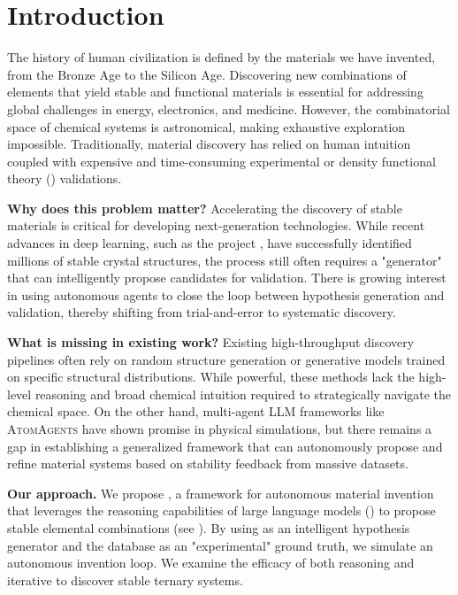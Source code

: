 \section{Introduction}
\label{sec:intro}

The history of human civilization is defined by the materials we have invented, from the Bronze Age to the Silicon Age. Discovering new combinations of elements that yield stable and functional materials is essential for addressing global challenges in energy, electronics, and medicine. However, the combinatorial space of chemical systems is astronomical, making exhaustive exploration impossible. Traditionally, material discovery has relied on human intuition coupled with expensive and time-consuming experimental or density functional theory (\dft) validations.

{\bf Why does this problem matter?} 
Accelerating the discovery of stable materials is critical for developing next-generation technologies. While recent advances in deep learning, such as the \gnome project \cite{merchant2023scaling}, have successfully identified millions of stable crystal structures, the process still often requires a "generator" that can intelligently propose candidates for validation. There is growing interest in using autonomous agents to close the loop between hypothesis generation and validation, thereby shifting from trial-and-error to systematic discovery.

{\bf What is missing in existing work?}
Existing high-throughput discovery pipelines often rely on random structure generation or generative models trained on specific structural distributions. While powerful, these methods lack the high-level reasoning and broad chemical intuition required to strategically navigate the chemical space. On the other hand, multi-agent LLM frameworks like \textsc{AtomAgents} \cite{ghafarollahi2025automating} have shown promise in physical simulations, but there remains a gap in establishing a generalized framework that can autonomously propose and refine material systems based on stability feedback from massive datasets.

{\bf Our approach.}
We propose \ours, a framework for autonomous material invention that leverages the reasoning capabilities of large language models (\llm) to propose stable elemental combinations (see ). By using \gpt as an intelligent hypothesis generator and the \gnome database as an "experimental" ground truth, we simulate an autonomous invention loop. We examine the efficacy of both \zeroshot reasoning and iterative \activelearning to discover stable ternary systems.

